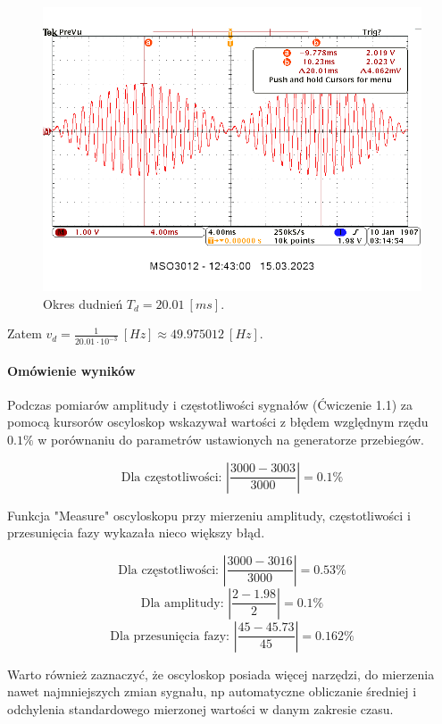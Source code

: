 \documentclass[14pt, table]{extarticle}
\begin{document}
\begin{figure}[H]
\includegraphics[scale=0.65]{A2}
\centering
\captionsetup{labelformat=empty}
\caption{Okres dudnień $T_d = 20.01 \ [ms]$.}
\end{figure}

Zatem $v_d = \frac{1}{20.01 \cdot 10^{-3}} \ [Hz] \approx 49.975012 \ [Hz] $.

\newpage
\paragraph{Omówienie wyników \\}

Podczas pomiarów amplitudy i częstotliwości sygnałów (Ćwiczenie 1.1) za pomocą kursorów oscyloskop wskazywał wartości z błędem względnym rzędu $0.1\%$ w porównaniu do parametrów ustawionych na generatorze przebiegów.

$$ \textrm{Dla częstotliwości: } \left| \frac{3000 - 3003}{3000} \right| = 0.1\% $$

Funkcja "Measure" oscyloskopu przy mierzeniu amplitudy, częstotliwości i przesunięcia fazy wykazała nieco większy błąd.

$$ \textrm{Dla częstotliwości: } \left| \frac{3000 - 3016}{3000} \right| = 0.53\% $$
$$ \textrm{Dla amplitudy: } \left| \frac{2 - 1.98}{2} \right| = 0.1\% $$
$$ \textrm{Dla przesunięcia fazy: } \left| \frac{45 - 45.73}{45} \right| = 0.162\% $$

Warto również zaznaczyć, że oscyloskop posiada więcej narzędzi, do mierzenia nawet najmniejszych zmian sygnału, np automatyczne obliczanie średniej i odchylenia standardowego mierzonej wartości w danym zakresie czasu. \\
\end{document}
